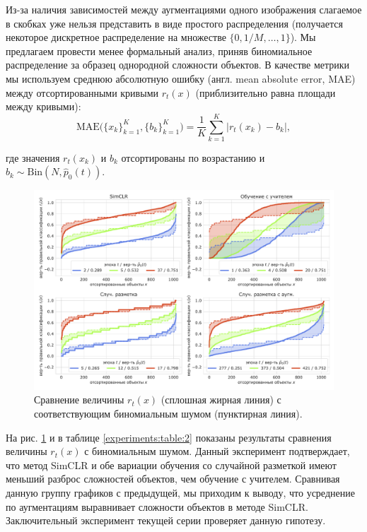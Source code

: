 \noindent
Из-за наличия зависимостей между аугментациями одного изображения слагаемое в скобках уже нельзя представить в виде простого распределения (получается некоторое дискретное распределение на множестве $\{0, 1/M, \dots, 1\}$). Мы предлагаем провести менее формальный анализ, приняв биномиальное распределение за образец однородной сложности объектов. В качестве метрики мы используем среднюю абсолютную ошибку (англ. mean absolute error, MAE) между отсортированными кривыми $r_t(x)$ (приблизительно равна площади между кривыми):
\begin{equation}
    \text{MAE}\Big(\{x_k\}_{k=1}^K, \{b_k\}_{k=1}^K\Big) = \frac{1}{K} \sum_{k=1}^K |r_t(x_k) - b_k|,
\end{equation}

\noindent
где значения $r_t(x_k)$ и $b_k$ отсортированы по возрастанию и $b_k \sim \text{Bin}(N, \widehat{p}_0(t))$.

\begin{figure}[H]
    \centering
    \includegraphics[width=17cm]{images/binom_noise2.pdf}
    \caption{Сравнение величины $r_t(x)$ (сплошная жирная линия) с соответствующим биномиальным шумом (пунктирная линия).}
    \label{experiments:pic:4}
\end{figure}{}

На рис. \ref{experiments:pic:4} и в таблице \ref{experiments:table:2} показаны результаты сравнения величины $r_t(x)$ с биномиальным шумом. Данный эксперимент подтверждает, что метод SimCLR и обе вариации обучения со случайной разметкой имеют меньший разброс сложностей объектов, чем обучение с учителем. Сравнивая данную группу графиков с предыдущей, мы приходим к выводу, что усреднение по аугментациям выравнивает сложности объектов в методе SimCLR. Заключительный эксперимент текущей серии проверяет данную гипотезу.

